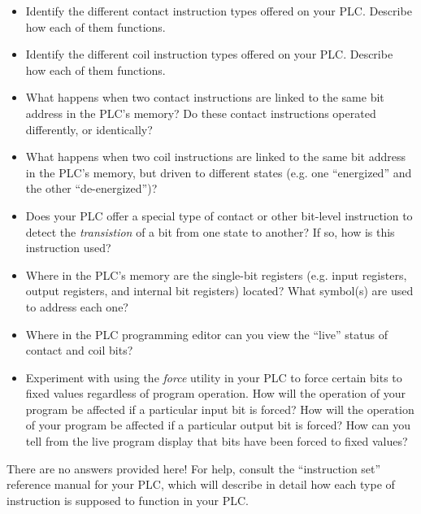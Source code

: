 \begin{itemize}
\item{} Identify the different contact instruction types offered on your PLC.  Describe how each of them functions.
\item{} Identify the different coil instruction types offered on your PLC.  Describe how each of them functions.
\item{} What happens when two contact instructions are linked to the same bit address in the PLC's memory?  Do these contact instructions operated differently, or identically?
\item{} What happens when two coil instructions are linked to the same bit address in the PLC's memory, but driven to different states (e.g. one ``energized'' and the other ``de-energized'')?
\item{} Does your PLC offer a special type of contact or other bit-level instruction to detect the {\it transistion} of a bit from one state to another?  If so, how is this instruction used?
\item{} Where in the PLC's memory are the single-bit registers (e.g. input registers, output registers, and internal bit registers) located?  What symbol(s) are used to address each one?
\item{} Where in the PLC programming editor can you view the ``live'' status of contact and coil bits?
\item{} Experiment with using the {\it force} utility in your PLC to force certain bits to fixed values regardless of program operation.  How will the operation of your program be affected if a particular input bit is forced?  How will the operation of your program be affected if a particular output bit is forced?  How can you tell from the live program display that bits have been forced to fixed values?
\end{itemize}







There are no answers provided here!  For help, consult the ``instruction set'' reference manual for your PLC, which will describe in detail how each type of instruction is supposed to function in your PLC.
 







